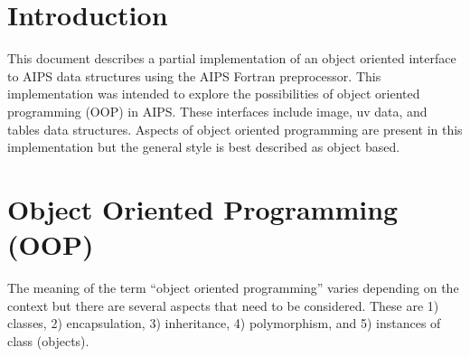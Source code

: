 \setlength{\textwidth}{6.5in}
\setlength{\textheight}{9in}
\setlength{\oddsidemargin}{0in}
\setlength{\evensidemargin}{0in}
\setlength{\topmargin}{-0.5in}

\pagestyle{plain}
\tableofcontents
\cleardoublepage
{}

\section{Introduction}


   This document describes a partial implementation of an
object oriented interface to AIPS data structures using the AIPS
Fortran preprocessor.  This implementation was intended to explore the
possibilities of object oriented programming (OOP) in AIPS.  These
interfaces include image, uv data,  and tables data structures.
Aspects of object oriented programming are present in this
implementation but the general style is best described as object
based.

\section{ Object Oriented Programming (OOP)}

   The meaning of the term ``object oriented programming'' varies
depending on the context but there are several aspects that need to be
considered. These are 1) classes,  2) encapsulation, 3) inheritance, 4)
polymorphism, and 5) instances of class (objects).

